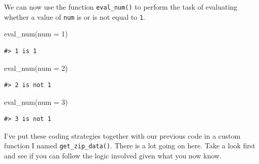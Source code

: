 \documentclass[
  letterpaper,
]{latex/krantz}
\newenvironment{Shaded}{\begin{snugshade}}{\end{snugshade}}
\newcommand{\AttributeTok}[1]{\textcolor[rgb]{0.40,0.45,0.13}{#1}}
\newcommand{\DecValTok}[1]{\textcolor[rgb]{0.68,0.00,0.00}{#1}}
\newcommand{\FunctionTok}[1]{\textcolor[rgb]{0.28,0.35,0.67}{#1}}
\newcommand{\NormalTok}[1]{\textcolor[rgb]{0.00,0.23,0.31}{#1}}
\begin{document}
We can now use the function \texttt{eval\_num()} to perform the task of
evaluating whether a value of \texttt{num} is or is not equal to
\texttt{1}.

\begin{Shaded}
\begin{Highlighting}[]
\FunctionTok{eval\_num}\NormalTok{(}\AttributeTok{num =} \DecValTok{1}\NormalTok{)}
\end{Highlighting}
\end{Shaded}

\begin{verbatim}
#> 1 is 1
\end{verbatim}

\begin{Shaded}
\begin{Highlighting}[]
\FunctionTok{eval\_num}\NormalTok{(}\AttributeTok{num =} \DecValTok{2}\NormalTok{)}
\end{Highlighting}
\end{Shaded}

\begin{verbatim}
#> 2 is not 1
\end{verbatim}

\begin{Shaded}
\begin{Highlighting}[]
\FunctionTok{eval\_num}\NormalTok{(}\AttributeTok{num =} \DecValTok{3}\NormalTok{)}
\end{Highlighting}
\end{Shaded}

\begin{verbatim}
#> 3 is not 1
\end{verbatim}

I've put these coding strategies together with our previous code in a
custom function I named \texttt{get\_zip\_data()}. There is a lot going
on here. Take a look first and see if you can follow the logic involved
given what you now know.
\end{document}
